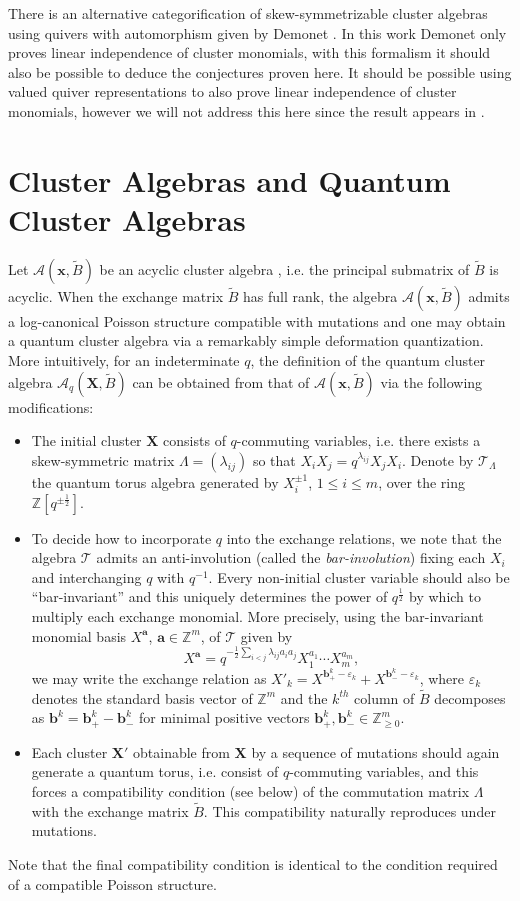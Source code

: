 \documentclass[12pt]{amsart}
\newcommand{\bfa}{\mathbf{a}}
\newcommand{\bfb}{\mathbf{b}}
\newcommand{\bfx}{\mathbf{x}}
\newcommand{\bfX}{\mathbf{X}}
\newcommand{\cA}{\mathcal{A}}
\newcommand{\cT}{\mathcal{T}}
\newcommand{\half}{{\frac{1}{2}}}
\newcommand{\ZZ}{\mathbb{Z}}
\begin{document}
  There is an alternative categorification of skew-symmetrizable cluster algebras using quivers with automorphism given by Demonet \cite{demonet}.
  In this work Demonet only proves linear independence of cluster monomials, with this formalism it should also be possible to deduce the conjectures proven here. 
  It should be possible using valued quiver representations to also prove linear independence of cluster monomials, however we will not address this here since the result appears in \cite{demonet}.

  \section{Cluster  Algebras and Quantum Cluster Algebras} Let $\cA(\bfx,\tilde B)$ be an acyclic cluster algebra \cite{berenstein-fomin-zelevinsky}, i.e. the principal submatrix of $\tilde B$ is acyclic.  
  When the exchange matrix $\tilde B$ has full rank, the algebra $\cA(\bfx,\tilde B)$ admits a log-canonical Poisson structure compatible with mutations \cite{gekhtman-shapiro-vainshtein} and one may obtain a quantum cluster algebra via a remarkably simple deformation quantization.  
  More intuitively, for an indeterminate $q$, the definition of the quantum cluster algebra $\cA_q(\bfX,\tilde B)$ can be obtained from that of $\cA(\bfx,\tilde B)$ via the following modifications:
  \begin{itemize}
    \item The initial cluster $\bfX$ consists of $q$-commuting variables, i.e. there exists a skew-symmetric matrix $\Lambda=(\lambda_{ij})$ so that $X_iX_j=q^{\lambda_{ij}}X_jX_i$.  
    Denote by $\cT_\Lambda$ the quantum torus algebra generated by $X_i^{\pm1}$, $1\le i\le m$, over the ring $\ZZ[q^{\pm\half}]$.
    \item To decide how to incorporate $q$ into the exchange relations, we note that the algebra $\cT$ admits an anti-involution (called the \emph{bar-involution}) fixing each $X_i$ and interchanging $q$ with $q^{-1}$.
    Every non-initial cluster variable should also be ``bar-invariant'' and this uniquely determines the power of $q^\half$ by which to multiply each exchange monomial.  
    More precisely, using the bar-invariant monomial basis $X^\bfa$, $\bfa\in\ZZ^m$, of $\cT$ given by
    \[X^\bfa=q^{-\half\sum\limits_{i<j}\lambda_{ij}a_ia_j}X_1^{a_1}\cdots X_m^{a_m},\]
    we may write the exchange relation as $X'_k=X^{\bfb_+^k-\varepsilon_k}+X^{\bfb_-^k-\varepsilon_k}$, where $\varepsilon_k$ denotes the standard basis vector of $\ZZ^m$ and the $k^{th}$ column of $\tilde B$ decomposes as $\bfb^k=\bfb^k_+-\bfb^k_-$ for minimal positive vectors $\bfb^k_+,\bfb^k_-\in\ZZ_{\ge0}^m$.
    \item Each cluster $\bfX'$ obtainable from $\bfX$ by a sequence of mutations should again generate a quantum torus, i.e. consist of $q$-commuting variables, and this forces a compatibility condition (see below) of the commutation matrix $\Lambda$ with the exchange matrix $\tilde B$.
    This compatibility naturally reproduces under mutations.
  \end{itemize}
  Note that the final compatibility condition is identical to the condition required of a compatible Poisson structure.
  
\end{document}
